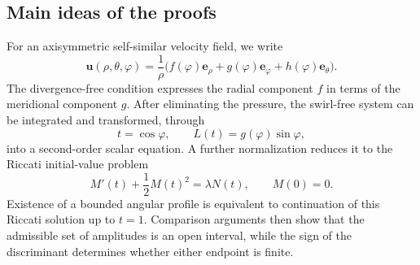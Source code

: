\documentclass{amsart}
\newcommand{\Bu}{{\boldsymbol{u}}}
\newcommand{\Be}{{\boldsymbol{e}}}
\newcommand{\BF}{{\boldsymbol{F}}}
\begin{document}



\subsection{Main ideas of the proofs}

For an axisymmetric self-similar velocity field, we write
\[
\Bu(\rho,\theta,\varphi)
=
\frac{1}{\rho}
\bigl(
f(\varphi)\Be_\rho
+
g(\varphi)\Be_\varphi
+
h(\varphi)\Be_\theta
\bigr).
\]
The divergence-free condition expresses the radial component
$f$ in terms of the meridional component $g$. After eliminating the
pressure, the swirl-free system can be integrated and transformed,
through
\[
t=\cos\varphi,
\qquad
L(t)=g(\varphi)\sin\varphi,
\]
into a second-order scalar equation. A further normalization reduces
it to the Riccati initial-value problem
\[
M'(t)+\frac12M(t)^2=\lambda N(t),
\qquad M(0)=0.
\]
Existence of a bounded angular profile is equivalent to continuation
of this Riccati solution up to $t=1$. Comparison arguments then show
that the admissible set of amplitudes is an open interval, while the
sign of the discriminant determines whether either endpoint is
finite.
\end{document}
